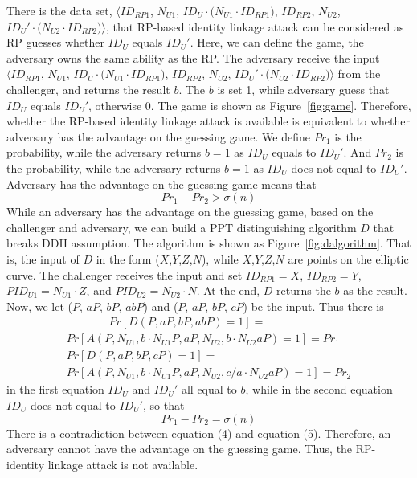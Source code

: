 There is the data set, $\langle ID_{RP1}$, $N_{U1}$, $ID_U \cdot{(N_{U1} \cdot {ID_{RP1})}}$, $ID_{RP2}$, $N_{U2}$, $ID_U' \cdot{(N_{U2} \cdot {ID_{RP2})}}\rangle$, that RP-based identity linkage attack can be considered as RP guesses whether $ID_U$ equals $ID_U'$. 
Here, we can define the game, the adversary owns the same ability as the RP. The adversary receive the input $\langle ID_{RP1}$, $N_{U1}$, $ID_U \cdot{(N_{U1} \cdot {ID_{RP1})}}$, $ID_{RP2}$, $N_{U2}$, $ID_U' \cdot{(N_{U2} \cdot {ID_{RP2})}}\rangle$ from the challenger, and returns the result $b$. 
The $b$ is set 1, while adversary guess that $ID_U$ equals $ID_U'$, otherwise 0. The game is shown as Figure~\ref{fig:game}.
Therefore, whether the RP-based identity linkage attack is available is equivalent to whether adversary has the advantage on the guessing game. 
We define $Pr_1$ is the probability, while the adversary returns $b=1$ as $ID_U$ equals to $ID_U'$. And $Pr_2$ is the probability, while the adversary returns $b=1$ as $ID_U$ does not equal to $ID_U'$.
Adversary has the advantage on the guessing game means that 
\vspace{-\topsep}
\begin{equation}
Pr_1-Pr_2>\sigma(n)
\end{equation}
While an adversary has the advantage on the guessing game, based on the challenger and adversary, we can build a PPT distinguishing algorithm $D$ that breaks DDH assumption. The algorithm is shown as Figure~\ref{fig:dalgorithm}. That is, the input of $D$ in the form ($X$,$Y$,$Z$,$N$), while $X$,$Y$,$Z$,$N$ are points on the elliptic curve. The challenger receives the input and set $ID_{RP1}=X$, $ID_{RP2}=Y$, $PID_{U1}=N_{U1} \cdot{Z}$, and $PID_{U2}=N_{U2} \cdot{N}$.  At the end, $D$ returns the $b$ as the result. 
Now, we let ($P$, $aP$, $bP$, $abP$) and  ($P$, $aP$, $bP$, $cP$) be the input. Thus there is
\vspace{-\topsep}
\begin{multline*}
\ \ \ \ \ \ \ \ \ \ \ \ \ \ \ \ \ Pr[D(P,aP,bP,abP)=1]=\\ Pr[A(P, N_{U1}, b \cdot{N_{U1}P}, aP, N_{U2},b\cdot{N_{U2} aP})=1]=Pr_1\\
Pr[D(P,aP,bP,cP)=1]=\ \ \ \ \ \ \ \ \ \ 
\\ Pr[A(P, N_{U1}, b \cdot{N_{U1}P}, aP, N_{U2},c/a \cdot{N_{U2}aP})=1]=Pr_2
\end{multline*}
in the first equation $ID_{U} $ and $ ID_{U}'$ all equal to $b$, while in the second equation $ID_{U}$ does not equal to $ID_{U}'$, so that
\begin{equation}
Pr_1-Pr_2=\sigma(n)
\end{equation}
There is a contradiction between equation (4) and equation (5). Therefore, an adversary cannot have the advantage on the guessing game. Thus, the RP-identity linkage attack is not available.


